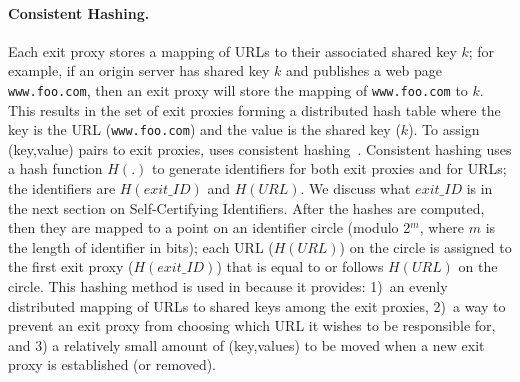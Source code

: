 \paragraph{Consistent Hashing.}
Each exit proxy stores a mapping of URLs to their associated shared key $k$; for example, if 
an origin server has shared key $k$ and publishes a web page {\tt www.foo.com}, then an exit 
proxy will store the mapping of {\tt www.foo.com} to $k$.  This results in the set of exit proxies 
forming a distributed hash table where the key is the URL ({\tt www.foo.com}) and the value is the 
shared key ($k$).  To assign (key,value) pairs to exit proxies, \system{} uses consistent 
hashing~\cite{karger1997consistent,lewin1998consistent}.  Consistent hashing uses a hash function $H(.)$
to generate identifiers for both exit proxies and for URLs; the identifiers are $H(exit\_ID)$ and $H(URL)$. 
We discuss what $exit\_ID$ is in the next section on Self-Certifying Identifiers.  After the hashes are 
computed, then they are mapped to a point on an identifier circle (modulo 2$^{m}$, where $m$ is the length of 
identifier in bits); each URL ($H(URL)$) on the circle is assigned to the first exit proxy ($H(exit\_ID)$) that 
is equal to or follows $H(URL)$ on the circle.  This hashing method is used in \system{} because it provides: 
1)~an evenly distributed mapping of URLs to shared keys among the exit proxies,
2)~a way to prevent an exit 
proxy from choosing which URL it wishes to be responsible for, and 3) a relatively small amount 
of (key,values) to be moved when a new exit proxy is established (or removed).  

